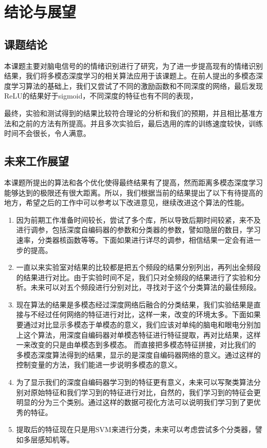 
\chapter{结论与展望}
\label{chap:chap8}
\section{课题结论}{
	本课题主要对脑电信号的的情绪识别进行了研究，为了进一步提高现有的情绪识别结果，我们将多模态深度学习的相关算法应用于该课题上。在前人提出的多模态深度学习算法的基础上，我们又尝试了不同的激励函数和不同深度的网络，最后发现ReLU的结果好于sigmoid，不同深度的特征也有不同的表现，
	
	最终，实验和测试得到的结果比较符合理论的分析和我们的预期，并且相比基准方法和之前的方法有所提高。并且多次实验后，最后选用的库的训练速度较快，训练时间不会很长，令人满意。
}
\section{未来工作展望}

	本课题所提出的算法和各个优化使得最终结果有了提高，然而距离多模态深度学习能够达到的极限还有很大距离。所以，我们根据当前的结果提出了以下有待提高的地方，希望之后的工作中可以参考以下改进意见，继续改进这个算法的性能。
	\begin{enumerate}
		\item 因为前期工作准备时间较长，尝试了多个库，所以导致后期时间较紧，来不及进行调参，包括深度自编码器的参数和分类器的参数，譬如隐层的数目，学习速率，分类器核函数等等。下面如果进行详尽的调参，相信结果一定会有进一步的提高。
		\item 一直以来实验室对结果的比较都是把五个频段的结果分别列出，再列出全频段的结果进行对比。由于实验时间不足，我们只对全频段的结果进行了实验和分析。未来可以对五个频段进行分别对比，寻找对于这个分类算法的最佳频段。
		\item 现在算法的结果是多模态经过深度网络后融合的分类结果，我们实验结果是直接与不经过任何网络的特征进行对比，这样一来，改变的环境太多。下面如果要通过对比显示多模态于单模态的意义，我们应该对单纯的脑电和眼电分别加上这个算法，用深度自编码器对单模态特征进行特征提取，再对比结果，这样一来改变的只是由单模态到多模态。 而直接把多模态特征拼接，对比我们的多模态深度算法得到的结果，显示的是深度自编码器网络的意义。通过这样的控制变量的方法，我们能进一步说明多模态的意义。
		\item 为了显示我们的深度自编码器学习到的特征更有意义，未来可以写聚类算法分别对原始特征和我们学习到的特征进行对比，自然的，我们学习到的特征会更明显的分为三个类别。通过这样的数据可视化方法可以说明我们学习到了更优秀的特征。
		\item 提取后的特征现在只是用SVM来进行分类，未来可以考虑尝试多个分类器，譬如多层感知机等。
	\end{enumerate}
